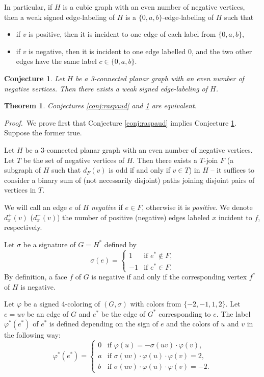 \documentclass[12pt]{article}
\newtheorem{theorem}{Theorem}
\newtheorem{conjecture}{Conjecture}
\newcommand{\pf}{{{\it Proof.}\ }}
\begin{document}
In particular, if $H$ is a cubic graph with an even number of negative vertices, then a weak signed edge-labeling of $H$ is a $\{0,a,b\}$-edge-labeling of $H$ such that 
\begin{itemize}
    \item if $v$ is positive, then it is incident to one edge of each label from $\{0,a,b\}$,
    \item if $v$ is negative, then it is incident to one edge labelled $0$, and the two other edges have the same label $c \in \{0,a,b\}$.
\end{itemize}

\begin{conjecture}
Let $H$ be a 3-connected planar graph with an even number of negative vertices. Then there exists a weak signed edge-labeling of $H$.
\label{conj:weak}
\end{conjecture}

\begin{theorem}
Conjectures \ref{conj:raspaud} and \ref{conj:weak} are equivalent.
\label{th:conj_equiv}
\end{theorem}
\pf We prove first that Conjecture \ref{conj:raspaud} implies Conjecture \ref{conj:weak}. Suppose the former true.

Let $H$ be a 3-connected planar graph with an even number of negative vertices. Let $T$ be the set of negative vertices of $H$. Then there exists a $T$-join $F$ (a subgraph of $H$ such that $d_F(v)$ is odd if and only if $v\in T$) in $H$ -- it suffices to consider a binary sum of (not necessarily disjoint) paths joining disjoint pairs of vertices in $T$. 

We will call an edge $e$ of $H$ \emph{negative} if $e\in F$, otherwise it is \emph{positive}. We denote $d_x^+(v)$ ($d_x^-(v)$) the number of positive (negative) edges labeled $x$ incident to $f$, respectively. 

Let $\sigma$ be a signature of $G = H ^*$ defined by
$$
\sigma(e)=\begin{cases} 1 & \textrm{if $e^*\notin F$,} \\ -1 & \textrm{if $e^* \in F$}.
\end{cases}
$$
By definition, a face $f$ of $G$ is negative if and only if the corresponding vertex $f^*$ of $H$ is negative.

Let $\varphi$ be a signed 4-coloring of $(G,\sigma)$ with colors from $\{-2,-1,1,2\}$. 
Let $e=uv$ be an edge of $G$ and $e^*$ be the edge of $G^*$ corresponding to $e$. The label $\varphi^*(e^*)$ of $e^*$ is defined depending on the sign of $e$ and the colors of $u$ and $v$ in the following way:
	\begin{equation}
	\varphi^*(e^*)=
	\begin{cases}
	    0 & \textrm{if $\varphi(u)=-\sigma(uv)\cdot \varphi(v)$,} \\
	    a & \textrm{if $\sigma(uv)\cdot\varphi(u)\cdot\varphi(v)=2$,} \\
	    b & \textrm{if $\sigma(uv)\cdot\varphi(u)\cdot\varphi(v)=-2$.} 
	\end{cases}
	\label{eq:def}
	\end{equation}
\end{document}
